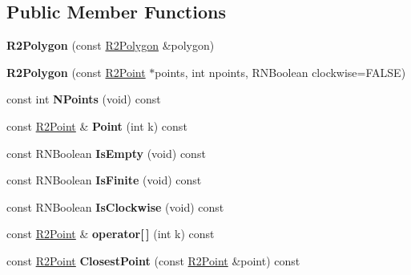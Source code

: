 \subsection*{Public Member Functions}
\begin{DoxyCompactItemize}
\item 
{\bfseries R2\+Polygon} (const \hyperlink{class_r2_polygon}{R2\+Polygon} \&polygon)\hypertarget{class_r2_polygon_a370f204b039439ddccbf6e2e5b9fdb05}{}\label{class_r2_polygon_a370f204b039439ddccbf6e2e5b9fdb05}

\item 
{\bfseries R2\+Polygon} (const \hyperlink{class_r2_point}{R2\+Point} $\ast$points, int npoints, R\+N\+Boolean clockwise=F\+A\+L\+SE)\hypertarget{class_r2_polygon_ad90b228efd5a474c3c5cd0bd3a9c6660}{}\label{class_r2_polygon_ad90b228efd5a474c3c5cd0bd3a9c6660}

\item 
const int {\bfseries N\+Points} (void) const \hypertarget{class_r2_polygon_af30b5cbd6e7b5fa3c2cddc7c3c408de1}{}\label{class_r2_polygon_af30b5cbd6e7b5fa3c2cddc7c3c408de1}

\item 
const \hyperlink{class_r2_point}{R2\+Point} \& {\bfseries Point} (int k) const \hypertarget{class_r2_polygon_aab02de73ccf42b6c807d361599e01ada}{}\label{class_r2_polygon_aab02de73ccf42b6c807d361599e01ada}

\item 
const R\+N\+Boolean {\bfseries Is\+Empty} (void) const \hypertarget{class_r2_polygon_ac2f8c62b0cee262073c7bb0876425f4e}{}\label{class_r2_polygon_ac2f8c62b0cee262073c7bb0876425f4e}

\item 
const R\+N\+Boolean {\bfseries Is\+Finite} (void) const \hypertarget{class_r2_polygon_a3a695d9f459f2835d06b9ef7533890d7}{}\label{class_r2_polygon_a3a695d9f459f2835d06b9ef7533890d7}

\item 
const R\+N\+Boolean {\bfseries Is\+Clockwise} (void) const \hypertarget{class_r2_polygon_abe8fb8eb0284c77b7be1dece9a496030}{}\label{class_r2_polygon_abe8fb8eb0284c77b7be1dece9a496030}

\item 
const \hyperlink{class_r2_point}{R2\+Point} \& {\bfseries operator\mbox{[}$\,$\mbox{]}} (int k) const \hypertarget{class_r2_polygon_a327eb82f86be3fd677763fc5c3e0a881}{}\label{class_r2_polygon_a327eb82f86be3fd677763fc5c3e0a881}

\item 
const \hyperlink{class_r2_point}{R2\+Point} {\bfseries Closest\+Point} (const \hyperlink{class_r2_point}{R2\+Point} \&point) const \hypertarget{class_r2_polygon_af8321ce008a2f25dcec4d1641b166b01}{}\label{class_r2_polygon_af8321ce008a2f25dcec4d1641b166b01}


\end{DoxyCompactItemize}
